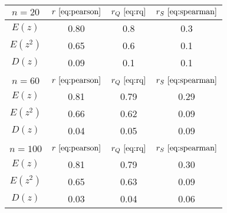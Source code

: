 \begin{tabular}{|c|c|c|c|}
\hline
$n = 20$ & $r ~\eqref{eq:pearson}$ & $r_Q ~\eqref{eq:rq}$ & $r_S ~\eqref{eq:spearman}$\\
\hline
$E(z)$ & 0.80 & 0.8 & 0.3\\
\hline
$E(z^2)$ & 0.65 & 0.6 & 0.1\\
\hline
$D(z)$ & 0.09 & 0.1 & 0.1\\
\hline
 &  &  & \\
\hline
$n = 60$ & $r ~\eqref{eq:pearson}$ & $r_Q ~\eqref{eq:rq}$ & $r_S ~\eqref{eq:spearman}$\\
\hline
$E(z)$ & 0.81 & 0.79 & 0.29\\
\hline
$E(z^2)$ & 0.66 & 0.62 & 0.09\\
\hline
$D(z)$ & 0.04 & 0.05 & 0.09\\
\hline
 &  &  & \\
\hline
$n = 100$ & $r ~\eqref{eq:pearson}$ & $r_Q ~\eqref{eq:rq}$ & $r_S ~\eqref{eq:spearman}$\\
\hline
$E(z)$ & 0.81 & 0.79 & 0.30\\
\hline
$E(z^2)$ & 0.65 & 0.63 & 0.09\\
\hline
$D(z)$ & 0.03 & 0.04 & 0.06\\
\hline
\end{tabular}


